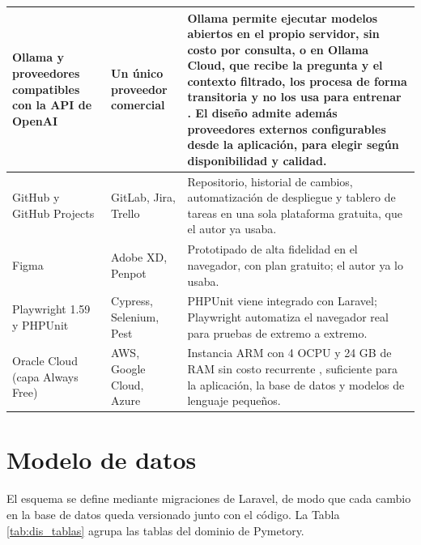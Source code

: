 {\begin{longtable}{|p{2.4cm}|p{2.9cm}|p{8.3cm}|}
Ollama y proveedores compatibles con la API de OpenAI & Un único proveedor comercial & Ollama permite ejecutar modelos abiertos en el propio servidor, sin costo por consulta, o en Ollama Cloud, que recibe la pregunta y el contexto filtrado, los procesa de forma transitoria y no los usa para entrenar \cite{ollama_privacy}. El diseño admite además proveedores externos configurables desde la aplicación, para elegir según disponibilidad y calidad. \\ \hline
GitHub y GitHub Projects & GitLab, Jira, Trello & Repositorio, historial de cambios, automatización de despliegue y tablero de tareas en una sola plataforma gratuita, que el autor ya usaba. \\ \hline
Figma & Adobe XD, Penpot & Prototipado de alta fidelidad en el navegador, con plan gratuito; el autor ya lo usaba. \\ \hline
Playwright 1.59 y PHPUnit & Cypress, Selenium, Pest & PHPUnit viene integrado con Laravel; Playwright automatiza el navegador real para pruebas de extremo a extremo. \\ \hline
Oracle Cloud (capa Always Free) & AWS, Google Cloud, Azure & Instancia ARM con 4 OCPU y 24 GB de RAM sin costo recurrente \cite{oci_always_free}, suficiente para la aplicación, la base de datos y modelos de lenguaje pequeños. \\ \hline
\end{longtable}
}

\section{Modelo de datos}
\label{sec:dis_datos}

El esquema se define mediante migraciones de Laravel, de modo que cada cambio en la base de datos queda versionado junto con el código. La Tabla \ref{tab:dis_tablas} agrupa las tablas del dominio de Pymetory.

